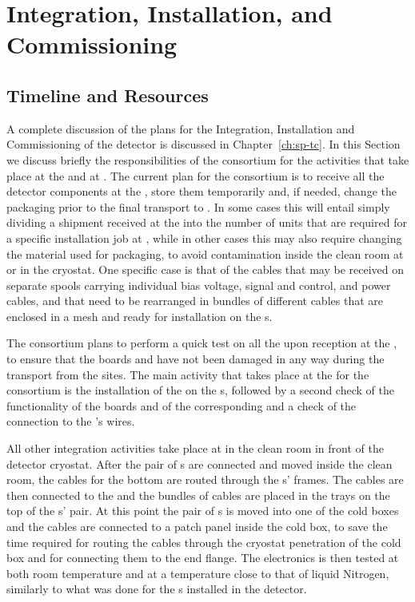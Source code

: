 \section{Integration, Installation, and Commissioning}
\label{sec:fdsp-tpcelec-integration}

\subsection{Timeline and Resources}
\label{sec:fdsp-tpcelec-integration-timeline}

A complete discussion of the plans for the Integration, Installation
and Commissioning of the detector is discussed in Chapter~\ref{ch:sp-tc}.
In this Section we discuss briefly the responsibilities of the 
consortium for the activities that take place at the
 and at \surf. The current plan for the 
consortium is to receive all the detector components at the ,
store them temporarily and, if needed, change the packaging prior to
the final transport to \surf. In some cases this will entail simply
dividing a shipment received at the  into the number of
units that are required for a specific installation job at \surf,
while in other cases this may also require changing the material
used for packaging, to avoid contamination inside the clean room
at \surf or in the cryostat. One specific case is that of the 
cables that may be received on separate spools carrying 
individual bias voltage, signal and control, and power cables, and that 
need to be rearranged in bundles of different cables that are enclosed
in a mesh and ready for installation on the s. 

The  consortium plans to perform a quick test on all
the  upon reception at the , to ensure that
the boards and  have not been damaged in any way during the transport 
from the   sites. The main activity that takes 
place at the  for the  consortium is the 
installation of the  on the s, followed by 
a second check of the functionality of the boards and of the 
corresponding  and a check of the connection to the 
's wires. 

All other integration activities take place at \surf in the clean room
in front of the detector cryostat. After the pair of s are 
connected and moved inside the clean room, the  cables
for the bottom  are routed through the s' frames.
The cables are then connected to the  and the bundles
of cables are placed in the trays on the top of the s' pair.
At this point the pair of s is moved into one of the cold
boxes and the cables are connected to a patch panel inside the cold box,
to save the time required for routing the cables through the cryostat
penetration of the cold box and for connecting them to the end flange.
The  electronics is then tested at both room temperature
and at a temperature close to that of liquid Nitrogen, similarly to
what was done for the s installed in the  detector.

